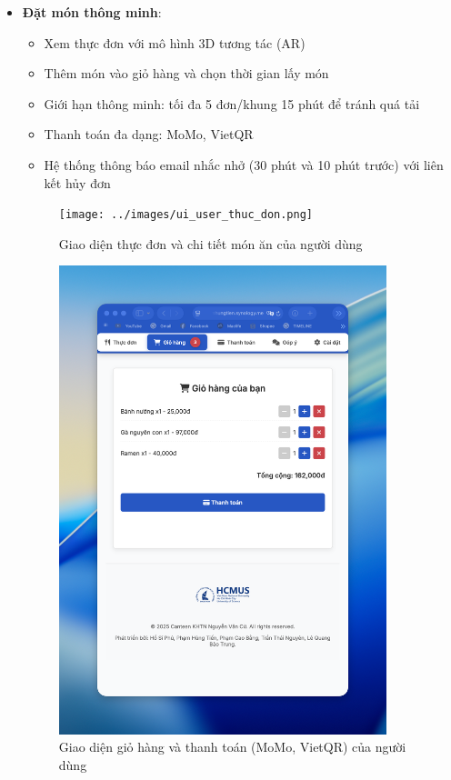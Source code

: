 \documentclass[12pt,a4paper]{article}
\begin{document}
\begin{itemize}[leftmargin=1cm]
    \item \textbf{Đặt món thông minh}:
        \begin{itemize}[leftmargin=0.5cm]
            \item Xem thực đơn với mô hình 3D tương tác (AR)
            \item Thêm món vào giỏ hàng và chọn thời gian lấy món
            \item Giới hạn thông minh: tối đa 5 đơn/khung 15 phút để tránh quá tải
            \item Thanh toán đa dạng: MoMo, VietQR
            \item Hệ thống thông báo email nhắc nhở (30 phút và 10 phút trước) với liên kết hủy đơn
        \end{itemize}
\begin{figure}[H]
    \centering
    \texttt{[image: ../images/ui\_user\_thuc\_don.png]} %
    \caption{Giao diện thực đơn và chi tiết món ăn của người dùng}
    \label{fig:ui_user_menu}
\end{figure}
\begin{figure}[H]
    \centering
    \includegraphics[width=0.9\textwidth]{../images/ui_user_gio_hang_thanh_toan.png} %
    \caption{Giao diện giỏ hàng và thanh toán (MoMo, VietQR) của người dùng}
    \label{fig:ui_user_cart_payment}
\end{figure}


\end{itemize}
\end{document}
